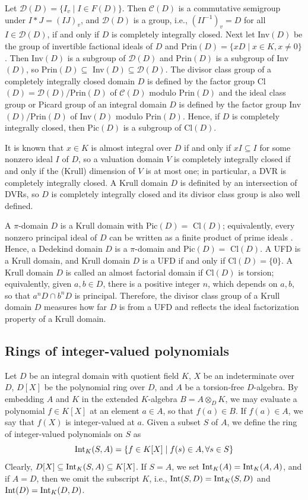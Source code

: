 \documentclass[10pt]{article}
\numberwithin{equation}{section}
\theoremstyle{definition}
\theoremstyle{definition}
\newcommand{\Int}{\textnormal{Int}}
\begin{document}
Let $\mathcal{D}(D) = \{I_v \mid I \in F(D)\}$. Then 
$\mathcal{C}(D)$ is a commutative semigroup under $I*J = (IJ)_v$,
and $\mathcal{D}(D)$ is a group, i.e., $(II^{-1})_v = D$ for all $I \in \mathcal{D}(D)$, if and only if $D$ is completely integrally closed. Next let Inv$(D)$ be the group of invertible factional ideals of $D$ and Prin$(D) = \{xD \mid x \in K, x \neq 0\}$. 
Then Inv$(D)$ is a subgroup of $\mathcal{D}(D)$ and Prin$(D)$ is a subgroup of Inv$(D)$, so Prin$(D) \subseteq$ Inv$(D) \subseteq \mathcal{D}(D)$. 
The divisor class group of a completely integrally closed domain $D$ is defined by the factor group Cl$(D) = \mathcal{D}(D)/$Prin$(D)$ of $\mathcal{C}(D)$ modulo Prin$(D)$ and the ideal class group or Picard group of an integral domain $D$ is defined by the factor group Inv$(D)/$Prin$(D)$ of Inv$(D)$ modulo Prin$(D)$. Hence, if $D$ is completely integrally closed, then Pic$(D)$ is a subgroup of Cl$(D)$. 

It is known that $x \in K$ is almost integral over $D$ if and only if $xI \subseteq I$ for some nonzero ideal $I$ of $D$, so a valuation domain $V$ is completely integrally closed if and only if the (Krull) dimension of $V$ is at most one; in particular, a DVR is completely integrally closed. A Krull domain $D$ is definited by an intersection of DVRs, so $D$ is completely integrally closed and its divisor class group is also well defined.


A $\pi$-domain $D$ is a Krull domain with Pic$(D) =$ Cl$(D)$;
equivalently, every nonzero principal ideal of $D$ can be written as a finite product of prime ideals \cite[IV. $\pi$-domains]{k89}. Hence, a Dedekind domain $D$ is a $\pi$-domain and Pic$(D) =$ Cl$(D)$.
A UFD is a Krull domain, and Krull domain $D$ is a UFD if and only if Cl$(D) = \{0\}$. A Krull domain $D$ is called an almost factorial domain if Cl$(D)$ is torsion; equivalently, given $a, b \in D$,
there is a positive integer $n$, which depends on $a,b$,
so that $a^nD \cap b^nD$ is principal.
Therefore, the divisor class group of a Krull domain $D$ measures how far $D$ is from a UFD and reflects the ideal factorization property of a Krull domain. 


\subsection{Rings of integer-valued polynomials}


Let $D$ be an integral domain with quotient field $K$,
$X$ be an indeterminate over $D$, $D[X]$ be the polynomial ring over $D$,
and $A$ be a torsion-free $D$-algebra. By embedding $A$ and $K$ in the extended $K$-algebra $B=A\otimes_D K$, 
we may evaluate a polynomial $f\in K[X]$ at an element $a\in A$, so that $f(a)\in B$. If $f(a)\in A$, we say that $f(X)$ is integer-valued at $a$. 
Given a subset $S$ of $A$, we define the ring of integer-valued polynomials on $S$ as
$$\Int_K(S,A)=\{f\in K[X] \mid f(s)\in A,\forall s\in S\}$$
Clearly, $D[X]\subseteq\Int_K(S, A)\subseteq K[X]$. If $S=A$, we set $\Int_K(A)=\Int_K(A,A)$, and if $A=D$, then we omit the subscript $K$, i.e., $\Int(S,D)= \Int_K(S,D)$ and $\Int(D) = \Int_K(D,D)$. 
\end{document}
